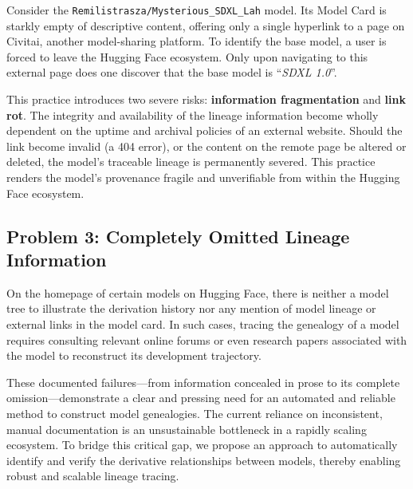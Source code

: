\begin{tcolorbox}[
    title={\textbf{Case Study: \texttt{Remilistrasza/Mysterious\_SDXL\_Lah}}},
    colback=gray!5!white,
    colframe=gray!75!black,
    fonttitle=\bfseries,
    sharp corners
]
Consider the \texttt{Remilistrasza/Mysterious\_SDXL\_Lah} model. Its Model Card is starkly empty of descriptive content, offering only a single hyperlink to a page on Civitai, another model-sharing platform. To identify the base model, a user is forced to leave the Hugging Face ecosystem. Only upon navigating to this external page does one discover that the base model is ``\textit{SDXL 1.0}''.

This practice introduces two severe risks: \textbf{information fragmentation} and \textbf{link rot}. The integrity and availability of the lineage information become wholly dependent on the uptime and archival policies of an external website. Should the link become invalid (a 404 error), or the content on the remote page be altered or deleted, the model's traceable lineage is permanently severed. This practice renders the model's provenance fragile and unverifiable from within the Hugging Face ecosystem.
\end{tcolorbox}

\subsection{Problem 3: Completely Omitted Lineage Information}
On the homepage of certain models on Hugging Face, there is neither a model tree to illustrate the derivation history nor any mention of model lineage or external links in the model card. In such cases, tracing the genealogy of a model requires consulting relevant online forums or even research papers associated with the model to reconstruct its development trajectory.

These documented failures—from information concealed in prose to its complete omission—demonstrate a clear and pressing need for an automated and reliable method to construct model genealogies. The current reliance on inconsistent, manual documentation is an unsustainable bottleneck in a rapidly scaling ecosystem. To bridge this critical gap, we propose an approach to automatically identify and verify the derivative relationships between models, thereby enabling robust and scalable lineage tracing.
